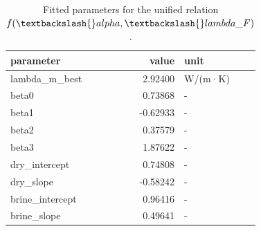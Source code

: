 \begin{table}[ht!]
\centering
\caption{Fitted parameters for the unified relation $f(\textbackslash{}alpha, \textbackslash{}lambda\_F)$.}
\label{tab:la\_fitted\_parameters}
\begin{tabular}{lrl}
\toprule
\textbf{parameter} & \textbf{value} & \textbf{unit} \\
\midrule
lambda\_m\_best & 2.92400 & W/(m·K) \\
beta0 & 0.73868 & - \\
beta1 & -0.62933 & - \\
beta2 & 0.37579 & - \\
beta3 & 1.87622 & - \\
dry\_intercept & 0.74808 & - \\
dry\_slope & -0.58242 & - \\
brine\_intercept & 0.96416 & - \\
brine\_slope & 0.49641 & - \\
\bottomrule
\end{tabular}
\end{table}
